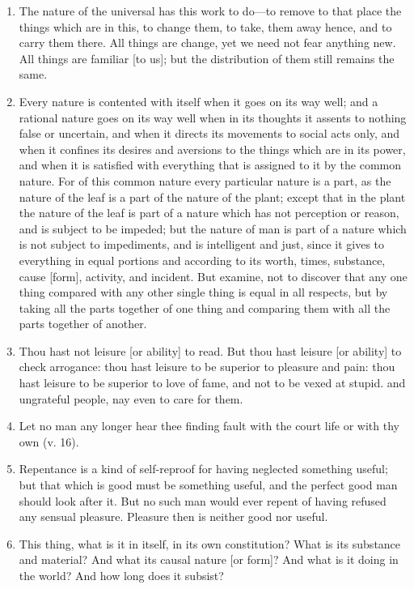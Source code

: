 \begin{enumerate}
\item The nature of the universal has this work to do—to remove to that place the things which are in this, to change them, to take, them away hence, and to carry them there. All things are change, yet we need not fear anything new. All things are familiar [{\clarify to us}]; but the distribution of them still remains the same.

\item Every nature is contented with itself when it goes on its way well; and a rational nature goes on its way well when in its thoughts it assents to nothing false or uncertain, and when it directs its movements to social acts only, and when it confines its desires and aversions to the things which are in its power, and when it is satisfied with everything that is assigned to it by the common nature. For of this common nature every particular nature is a part, as the nature of the leaf is a part of the nature of the plant; except that in the plant the nature of the leaf is part of a nature which has not perception or reason, and is subject to be impeded; but the nature of man is part of a nature which is not subject to impediments, and is intelligent and just, since it gives to everything in equal portions and according to its worth, times, substance, cause [{\clarify form}], activity, and incident. But examine, not to discover that any one thing compared with any other single thing is equal in all respects, but by taking all the parts together of one thing and comparing them with all the parts together of another.

\item Thou hast not leisure [{\clarify or ability}] to read. But thou hast leisure [{\clarify or ability}] to check arrogance: thou hast leisure to be superior to pleasure and pain: thou hast leisure to be superior to love of fame, and not to be vexed at stupid. and ungrateful people, nay even to care for them.

\item Let no man any longer hear thee finding fault with the court life or with thy own (v. 16).

\item Repentance is a kind of self-reproof for having neglected something useful; but that which is good must be something useful, and the perfect good man should look after it. But no such man would ever repent of having refused any sensual pleasure. Pleasure then is neither good nor useful.

\item This thing, what is it in itself, in its own constitution? What is its substance and material? And what its causal nature [{\clarify or form}]? And what is it doing in the world? And how long does it subsist?


\end{enumerate}
